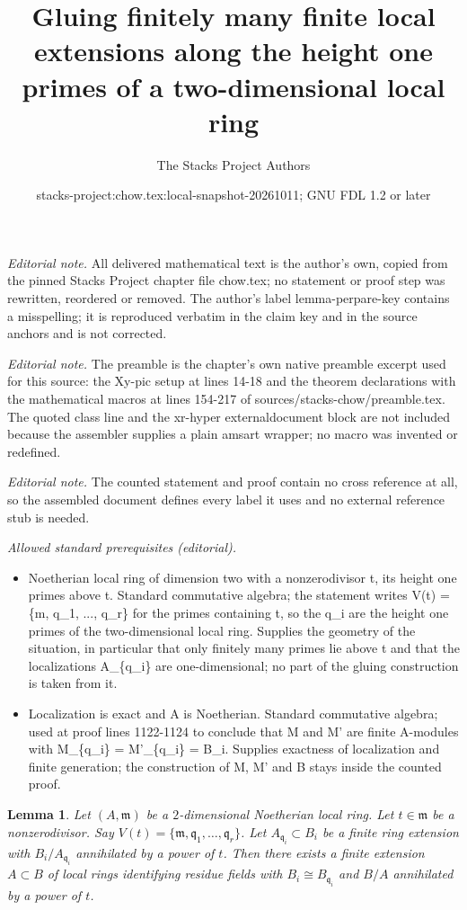 \documentclass[10pt,a4paper]{amsart}
\title{Gluing finitely many finite local extensions along the height one primes of a two-dimensional local ring}
\author{The Stacks Project Authors}
\date{stacks-project:chow.tex:local-snapshot-20261011; GNU FDL 1.2 or later}
\theoremstyle{plain}
\newtheorem{lemma}[subsection]{Lemma}
\theoremstyle{definition}
\theoremstyle{remark}
\numberwithin{equation}{subsection}
\begin{document}
\maketitle
\noindent\textit{Editorial note.} All delivered mathematical text is the author's own, copied from the pinned Stacks Project chapter file chow.tex; no statement or proof step was rewritten, reordered or removed. The author's label lemma-perpare-key contains a misspelling; it is reproduced verbatim in the claim key and in the source anchors and is not corrected.\par\medskip
\noindent\textit{Editorial note.} The preamble is the chapter's own native preamble excerpt used for this source: the Xy-pic setup at lines 14-18 and the theorem declarations with the mathematical macros at lines 154-217 of sources/stacks-chow/preamble.tex. The quoted class line and the xr-hyper externaldocument block are not included because the assembler supplies a plain amsart wrapper; no macro was invented or redefined.\par\medskip
\noindent\textit{Editorial note.} The counted statement and proof contain no cross reference at all, so the assembled document defines every label it uses and no external reference stub is needed.\par\medskip
\noindent\textit{Allowed standard prerequisites (editorial).}\begin{itemize}
\item Noetherian local ring of dimension two with a nonzerodivisor t, its height one primes above t. Standard commutative algebra; the statement writes V(t) = \{m, q\_1, ..., q\_r\} for the primes containing t, so the q\_i are the height one primes of the two-dimensional local ring. Supplies the geometry of the situation, in particular that only finitely many primes lie above t and that the localizations A\_\{q\_i\} are one-dimensional; no part of the gluing construction is taken from it.
\item Localization is exact and A is Noetherian. Standard commutative algebra; used at proof lines 1122-1124 to conclude that M and M' are finite A-modules with M\_\{q\_i\} = M'\_\{q\_i\} = B\_i. Supplies exactness of localization and finite generation; the construction of M, M' and B stays inside the counted proof.
\end{itemize}\medskip
\begin{lemma}
\label{lemma-perpare-key}
Let $(A, \mathfrak m)$ be a $2$-dimensional Noetherian local ring.
Let $t \in \mathfrak m$ be a nonzerodivisor. Say
$V(t) = \{\mathfrak m, \mathfrak q_1, \ldots, \mathfrak q_r\}$.
Let $A_{\mathfrak q_i} \subset B_i$ be a finite ring
extension with $B_i/A_{\mathfrak q_i}$ annihilated by a power of
$t$. Then there exists a finite extension $A \subset B$ of
local rings identifying residue fields
with $B_i \cong B_{\mathfrak q_i}$ and $B/A$ annihilated
by a power of $t$.
\end{lemma}
\end{document}
